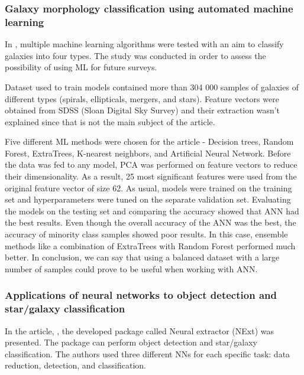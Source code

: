  
\subsubsection{Galaxy morphology classification using automated machine learning} 
In \cite{REZA2021100492}, multiple machine learning algorithms were tested with an aim to classify galaxies into four types. The study was conducted in order to assess the possibility of using ML for future surveys. 

Dataset used to train models contained more than 304 000 samples of galaxies of different types (spirals, ellipticals, mergers, and stars). Feature vectors were obtained from SDSS (Sloan Digital Sky Survey) and their extraction wasn't explained since that is not the main subject of the article. %

Five different ML methods were chosen for the article - Decision trees, Random Forest, ExtraTrees, K-nearest neighbors, and Artificial Neural Network. Before the data was fed to any model, PCA was performed on feature vectors to reduce their dimensionality. As a result, 25 most significant features were used from the original feature vector of size 62. As usual, models were trained on the training set and hyperparameters were tuned on the separate validation set. 
Evaluating the models on the testing set and comparing the accuracy showed that ANN had the best results. Even though the overall accuracy of the ANN was the best, the accuracy of minority class samples showed poor results. In this case, ensemble methods like a combination of ExtraTrees with Random Forest performed much better. In conclusion, we can say that using a balanced dataset with a large number of samples could prove to be useful when working with ANN. 




\subsubsection{Applications of neural networks to object detection and star/galaxy classification}
In the article, \cite{Andreon2000}, the developed package called Neural extractor (NExt) was presented. The package can perform object detection and star/galaxy classification. The authors used three different NNs for each specific task: data reduction, detection, and classification. 

